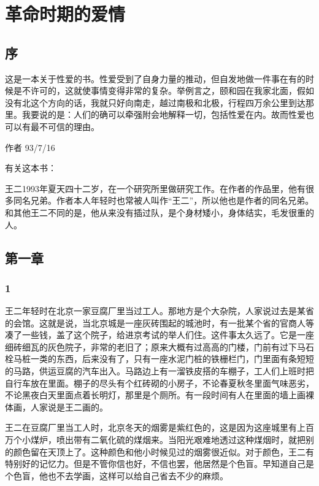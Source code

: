 \chapter{革命时期的爱情}

\section{序}

这是一本关于性爱的书。性爱受到了自身力量的推动，但自发地做一件事在有的时候是不许可的，这就使事情变得非常的复杂。举例言之，颐和园在我家北面，假如没有北这个方向的话，我就只好向南走，越过南极和北极，行程四万余公里到达那里。我要说的是：人们的确可以牵强附会地解释一切，包括性爱在内。故而性爱也可以有最不可信的理由。 

作者 93/7/16 

有关这本书：　 

王二1993年夏天四十二岁，在一个研究所里做研究工作。在作者的作品里，他有很多同名兄弟。作者本人年轻时也常被人叫作“王二”，所以他也是作者的同名兄弟。和其他王二不同的是，他从来没有插过队，是个身材矮小，身体结实，毛发很重的人。

\section{第一章}

\subsection{1}

王二年轻时在北京一家豆腐厂里当过工人。那地方是个大杂院，人家说过去是某省的会馆。这就是说，当北京城是一座灰砖围起的城池时，有一批某个省的官商人等凑了一些钱，盖了这个院子，给进京考试的举人们住。这件事太久远了。它是一座细砖细瓦的灰色院子，非常的老旧了；原来大概有过高高的门楼，门前有过下马石栓马桩一类的东西，后来没有了，只有一座水泥门桩的铁栅栏门，门里面有条短短的马路，供运豆腐的汽车出入。马路边上有一溜铁皮搭的车棚子，工人们上班时把自行车放在里面。棚子的尽头有个红砖砌的小房子，不论春夏秋冬里面气味恶劣，不论黑夜白天里面点着长明灯，那里是个厕所。有一段时间有人在里面的墙上画裸体画，人家说是王二画的。 

王二在豆腐厂里当工人时，北京冬天的烟雾是紫红色的，这是因为这座城里有上百万个小煤炉，喷出带有二氧化硫的煤烟来。当阳光艰难地透过这种煤烟时，就把别的颜色留在天顶上了。这种颜色和他小时候见过的烟雾很近似。对于颜色，王二有特别好的记忆力。但是不管你信也好，不信也罢，他居然是个色盲。早知道自己是个色盲，他也不去学画，这样可以给自己省去不少的麻烦。 

